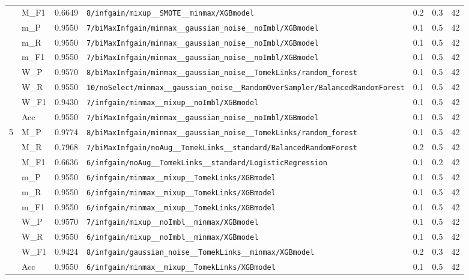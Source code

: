 \begin{table}[htbp]
\begin{tabular}{|c|l|c|>{\ttfamily\footnotesize}p{7.2cm}|c|c|c|}
 & M\_F1 & 0.6649 & \texttt{8/infgain/mixup\_\_SMOTE\_\_minmax/XGBmodel} & 0.2 & 0.3  & 42 \\ 
 & m\_P & 0.9550 & \texttt{7/biMaxInfgain/minmax\_\_gaussian\_noise\_\_noImbl/XGBmodel} & 0.1 & 0.5  & 42 \\ 
 & m\_R & 0.9550 & \texttt{7/biMaxInfgain/minmax\_\_gaussian\_noise\_\_noImbl/XGBmodel} & 0.1 & 0.5  & 42 \\ 
 & m\_F1 & 0.9550 & \texttt{7/biMaxInfgain/minmax\_\_gaussian\_noise\_\_noImbl/XGBmodel} & 0.1 & 0.5  & 42 \\ 
 & W\_P & 0.9570 & \texttt{8/biMaxInfgain/minmax\_\_gaussian\_noise\_\_TomekLinks/random\_forest} & 0.1 & 0.5  & 42 \\ 
 & W\_R & 0.9550 & \texttt{10/noSelect/minmax\_\_gaussian\_noise\_\_RandomOverSampler/BalancedRandomForest} & 0.1 & 0.5  & 42 \\ 
 & W\_F1 & 0.9430 & \texttt{7/infgain/minmax\_\_mixup\_\_noImbl/XGBmodel} & 0.1 & 0.5  & 42 \\ 
 & Acc & 0.9550 & \texttt{7/biMaxInfgain/minmax\_\_gaussian\_noise\_\_noImbl/XGBmodel} & 0.1 & 0.5  & 42 \\ 
\hline
\multirow{10}{*}{5} & M\_P & 0.9774 & \texttt{8/biMaxInfgain/minmax\_\_gaussian\_noise\_\_TomekLinks/random\_forest} & 0.1 & 0.5  & 42 \\ 
 & M\_R & 0.7968 & \texttt{7/biMaxInfgain/noAug\_\_TomekLinks\_\_standard/BalancedRandomForest} & 0.2 & 0.5  & 42 \\ 
 & M\_F1 & 0.6636 & \texttt{6/infgain/noAug\_\_TomekLinks\_\_standard/LogisticRegression} & 0.1 & 0.2  & 42 \\ 
 & m\_P & 0.9550 & \texttt{6/infgain/minmax\_\_mixup\_\_TomekLinks/XGBmodel} & 0.1 & 0.5  & 42 \\ 
 & m\_R & 0.9550 & \texttt{6/infgain/minmax\_\_mixup\_\_TomekLinks/XGBmodel} & 0.1 & 0.5  & 42 \\ 
 & m\_F1 & 0.9550 & \texttt{6/infgain/minmax\_\_mixup\_\_TomekLinks/XGBmodel} & 0.1 & 0.5  & 42 \\ 
 & W\_P & 0.9570 & \texttt{7/infgain/mixup\_\_noImbl\_\_minmax/XGBmodel} & 0.1 & 0.5  & 42 \\ 
 & W\_R & 0.9550 & \texttt{6/infgain/mixup\_\_noImbl\_\_minmax/XGBmodel} & 0.1 & 0.5  & 42 \\ 
 & W\_F1 & 0.9424 & \texttt{8/infgain/gaussian\_noise\_\_TomekLinks\_\_minmax/XGBmodel} & 0.2 & 0.3  & 42 \\ 
 & Acc & 0.9550 & \texttt{6/infgain/minmax\_\_mixup\_\_TomekLinks/XGBmodel} & 0.1 & 0.5  & 42 \\ 
\hline
\end{tabular}
\end{table}